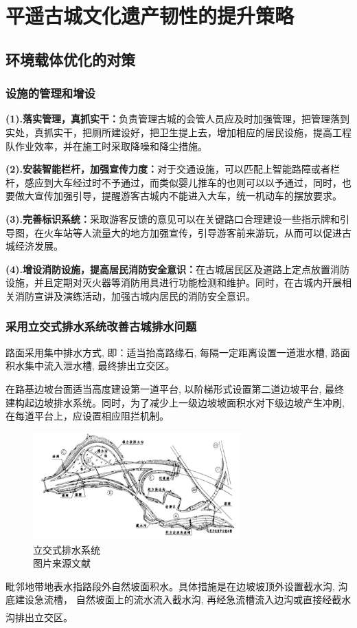 \documentclass[UTF8]{ctexart}
\newcommand{\upcite}[1]{\textsuperscript{\textsuperscript{\cite{#1}}}}
\begin{document}
\section{平遥古城文化遗产韧性的提升策略}
    \subsection{环境载体优化的对策}
        \subsubsection{设施的管理和增设}
        \textbf{(1).落实管理，真抓实干：}负责管理古城的会管人员应及时加强管理，把管理落到实处，真抓实干，把厕所建设好，把卫生提上去，增加相应的居民设施，提高工程队作业效率，并在施工时采取降噪和降尘措施。

        \textbf{(2).安装智能栏杆，加强宣传力度：}对于交通设施，可以匹配上智能路障或者栏杆，感应到大车经过时不予通过，而类似婴儿推车的也则可以以予通过，同时，也要做大宣传加强引导，提醒游客古城内不能进入大车，统一机动车的摆放要求。
        
        \textbf{(3).完善标识系统：}采取游客反馈的意见可以在关键路口合理建设一些指示牌和引导图，在火车站等人流量大的地方加强宣传，引导游客前来游玩，从而可以促进古城经济发展。
        
        \textbf{(4).增设消防设施，提高居民消防安全意识：}在古城居民区及道路上定点放置消防设施，并且定期对灭火器等消防用具进行功能检测和维护。同时，在古城内开展相关消防宣讲及演练活动，加强古城内居民的消防安全意识。
        
        \subsubsection{采用立交式排水系统改善古城排水问题}
                路面采用集中排水方式, 即：适当抬高路缘石, 每隔一定距离设置一道泄水槽, 路面积水集中流入泄水槽, 最终排出立交区。
        
                在路基边坡台面适当高度建设第一道平台, 以阶梯形式设置第二道边坡平台, 最终建构起边坡排水系统。同时，为了减少上一级边坡坡面积水对下级边坡产生冲刷, 在每道平台上，应设置相应阻拦机制。
                \begin{figure}[H]
            \centering
            \includegraphics[width=8cm]{排水.png}
            \caption[plain]{立交式排水系统\\图片来源文献\cite{魏明祥2002丹东古城互通式立交的排水设计}}
            \label{fig:my_label}
            \end{figure}
                毗邻地带地表水指路段外自然坡面积水。具体措施是在边坡坡顶外设置截水沟, 沟底建设急流槽， 自然坡面上的流水流入截水沟, 再经急流槽流入边沟或直接经截水沟排出立交区。\upcite{赵阔宇2011浅谈边坡生态防护技术在古城墙保护中绿化的应用}
\end{document}
